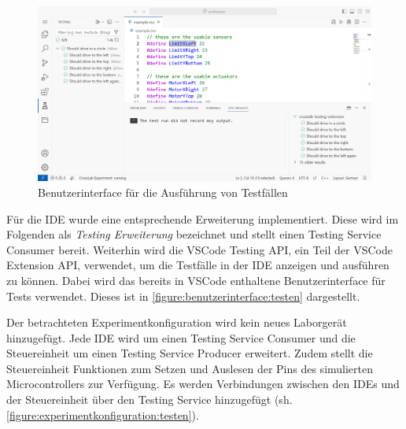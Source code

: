 \begin{figure}[tbp]
    \centering
    \includegraphics[trim={0 3px 0 0},clip,width=\textwidth]{images/tests-success.png}
    \caption{Benutzerinterface für die Ausführung von Testfällen}
    \label{figure:benutzerinterface:testen}
\end{figure}

Für die IDE wurde eine entsprechende Erweiterung implementiert. Diese wird im Folgenden als \textit{Testing Erweiterung} bezeichnet und stellt einen Testing Service Consumer bereit. Weiterhin wird die VSCode Testing API, ein Teil der VSCode Extension API, verwendet, um die Testfälle in der IDE anzeigen und ausführen zu können. Dabei wird das bereits in VSCode enthaltene Benutzerinterface für Tests verwendet. Dieses ist in \autoref{figure:benutzerinterface:testen} dargestellt.

Der betrachteten Experimentkonfiguration wird kein neues Laborgerät hinzugefügt. Jede IDE wird um einen Testing Service Consumer und die Steuereinheit um einen Testing Service Producer erweitert. Zudem stellt die Steuereinheit Funktionen zum Setzen und Auslesen der Pins des simulierten Microcontrollers zur Verfügung. Es werden Verbindungen zwischen den IDEs und der Steuereinheit über den Testing Service hinzugefügt (sh. \autoref{figure:experimentkonfiguration:testen}).